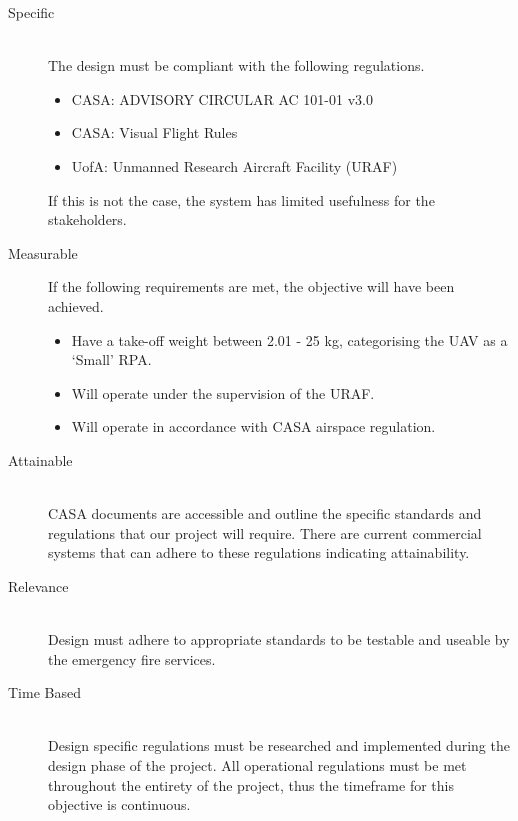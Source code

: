 \begin{appendices}
\begin{description}
    \item[Specific] \hfill \\
    The design must be compliant with the following regulations.
    \begin{itemize}
        \item CASA: ADVISORY CIRCULAR AC 101-01 v3.0
        \item CASA: Visual Flight Rules
        \item UofA: Unmanned Research Aircraft Facility (URAF)
    \end{itemize}
    If this is not the case, the system has limited usefulness for the stakeholders.
    \item[Measurable] \hfill
    If the following requirements are met, the objective will have been achieved.
    \begin{itemize}
        \item Have a take-off weight between 2.01 - 25 kg, categorising the UAV as a `Small' RPA.
        \item Will operate under the supervision of the URAF.
        \item Will operate in accordance with CASA airspace regulation.
    \end{itemize}
    \item[Attainable] \hfill \\
    CASA documents are accessible and outline the specific standards and regulations that our project will require. There are current commercial systems that can adhere to these regulations indicating attainability. 
    
    \item[Relevance]\hfill \\
    Design must adhere to appropriate standards to be testable and useable by the emergency fire services.
    \item[Time Based] \hfill \\
    Design specific regulations must be researched and implemented during the design phase of the project. All operational regulations must be met throughout the entirety of the project, thus the timeframe for this objective is continuous. 
\end{description}


\end{appendices}

